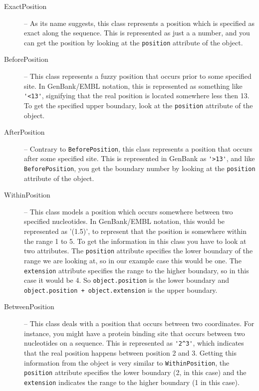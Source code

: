 \documentclass{report}
\begin{document}
\begin{description}
  \item[ExactPosition] -- As its name suggests, this class represents a position which is specified as exact along the sequence. This is represented as just a a number, and you can get the position by looking at the \verb|position| attribute of the object.

  \item[BeforePosition] -- This class represents a fuzzy position
  that occurs prior to some specified site. In GenBank/EMBL notation,
  this is represented as something like \verb|'<13'|, signifying that
  the real position is located somewhere less then 13. To get
  the specified upper boundary, look at the \verb|position|
  attribute of the object.

  \item[AfterPosition] -- Contrary to \verb|BeforePosition|, this
  class represents a position that occurs after some specified site.
  This is represented in GenBank as \verb|'>13'|, and like
  \verb|BeforePosition|, you get the boundary number by looking
  at the \verb|position| attribute of the object.

  \item[WithinPosition] -- This class models a position which occurs somewhere between two specified nucleotides. In GenBank/EMBL notation, this would be represented as '(1.5)', to represent that the position is somewhere within the range 1 to 5. To get the information in this class you have to look at two attributes. The \verb|position| attribute specifies the lower boundary of the range we are looking at, so in our example case this would be one. The \verb|extension| attribute specifies the range to the higher boundary, so in this case it would be 4. So \verb|object.position| is the lower boundary and \verb|object.position + object.extension| is the upper boundary.

  \item[BetweenPosition] -- This class deals with a position that
  occurs between two coordinates. For instance, you might have a
  protein binding site that occurs between two nucleotides on a
  sequence. This is represented as \verb|'2^3'|, which indicates that
  the real position happens between position 2 and 3. Getting
  this information from the object is very similar to
  \verb|WithinPosition|, the \verb|position| attribute specifies
  the lower boundary (2, in this case) and the \verb|extension|
  indicates the range to the higher boundary (1 in this case).
\end{description}
\end{document}
